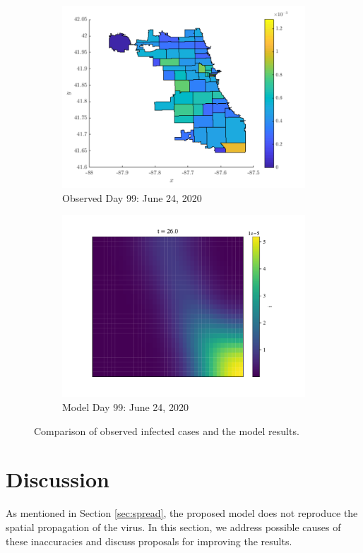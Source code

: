 \documentclass[11pt]{article}
\begin{document}
\begin{figure}[H]
			\begin{subfigure}{0.5\textwidth}
				\includegraphics[width=\textwidth]{tfin-cases}
				\caption{Observed Day 99: June 24, 2020}
			\end{subfigure}%
			\begin{subfigure}{0.5\textwidth}
				\includegraphics[width=\textwidth]{infected_99}
				\caption{Model Day 99: June 24, 2020}
			\end{subfigure}
		
			\caption{Comparison of observed infected cases and the model results.}
			\label{fig:spatial-results}
		\end{figure}
	

\section{Discussion}
	As mentioned in Section \ref{sec:spread}, the proposed model does not reproduce the spatial propagation of the virus.
	In this section, we address possible causes of these inaccuracies and discuss proposals for improving the results.
	
\end{document}
